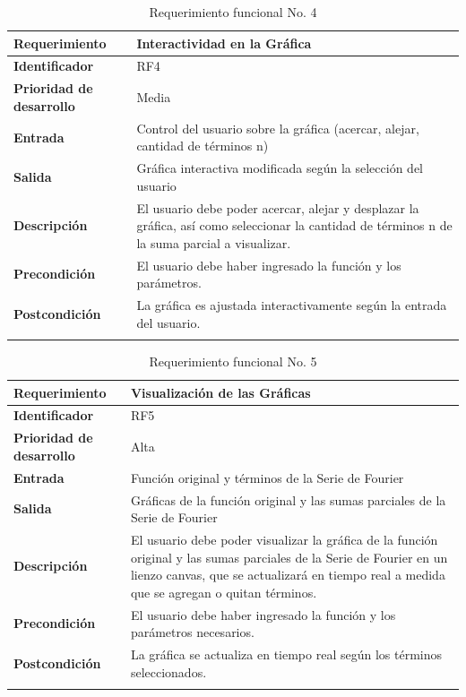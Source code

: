 \begin{longtable}{|m{3.5cm}|m{9.5cm}|}
	\hline
	\rowcolor{black!75} \color{white}\textbf{Requerimiento} & \color{white}\textbf{Interactividad en la Gráfica} \\
	\hline
	\textbf{Identificador} & RF4 \\
	\hline
	\textbf{Prioridad de desarrollo} & Media \\
	\hline
	\textbf{Entrada} & Control del usuario sobre la gráfica (acercar, alejar, cantidad de términos n) \\
	\hline
	\textbf{Salida} & Gráfica interactiva modificada según la selección del usuario \\
	\hline
	\textbf{Descripción} & El usuario debe poder acercar, alejar y desplazar la gráfica, así como seleccionar la cantidad de términos n de la suma parcial a visualizar. \\
	\hline
	\textbf{Precondición} & El usuario debe haber ingresado la función y los parámetros. \\
	\hline
	\textbf{Postcondición} & La gráfica es ajustada interactivamente según la entrada del usuario. \\
	\hline
	\rowcolor{white} \caption{Requerimiento funcional No. 4} \label{tabla:RF4} \\
\end{longtable}

\begin{longtable}{|m{3.5cm}|m{9.5cm}|}
	\hline
	\rowcolor{black!75} \color{white}\textbf{Requerimiento} & \color{white}\textbf{Visualización de las Gráficas} \\
	\hline
	\textbf{Identificador} & RF5 \\
	\hline
	\textbf{Prioridad de desarrollo} & Alta \\
	\hline
	\textbf{Entrada} & Función original y términos de la Serie de Fourier \\
	\hline
	\textbf{Salida} & Gráficas de la función original y las sumas parciales de la Serie de Fourier \\
	\hline
	\textbf{Descripción} & El usuario debe poder visualizar la gráfica de la función original y las sumas parciales de la Serie de Fourier en un lienzo canvas, que se actualizará en tiempo real a medida que se agregan o quitan términos. \\
	\hline
	\textbf{Precondición} & El usuario debe haber ingresado la función y los parámetros necesarios. \\
	\hline
	\textbf{Postcondición} & La gráfica se actualiza en tiempo real según los términos seleccionados. \\
	\hline
	\rowcolor{white} \caption{Requerimiento funcional No. 5} \label{tabla:RF5} \\
\end{longtable}


